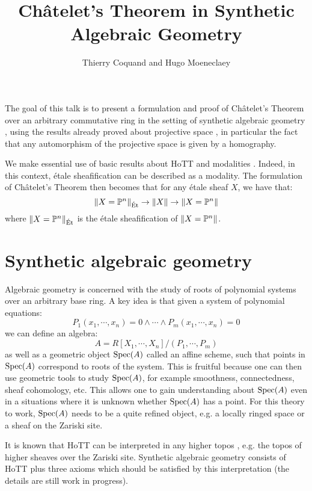 \documentclass{../util/zariski}
\title{Ch\^atelet's Theorem in Synthetic Algebraic Geometry}
\author{Thierry Coquand and Hugo Moeneclaey}
\begin{document}
\maketitle

The goal of this talk is to present a formulation and proof of Ch\^atelet's Theorem over an arbitrary commutative ring
in the setting of synthetic algebraic geometry \cite{draft}, using the results already proved about projective
space \cite{sag-projective}, in particular the fact that any automorphism of the projective space is given
by a homography. 

We make essential use of basic results about HoTT \cite{hott}
and modalities \cite{modalities}. Indeed, in this context, \'etale sheafification can be described
as a modality. The formulation of Ch\^atelet's Theorem then becomes that for any étale sheaf $X$, we have that:
\[\lVert X=\mathbb{P}^n \rVert_{\mathrm{\acute{E}t}} \to \lVert X \rVert \to \lVert X=\mathbb{P}^n \rVert\]
where $\lVert X=\mathbb{P}^n \rVert_{\mathrm{\acute{E}t}}$ is the étale sheafification of $\lVert X=\mathbb{P}^n \rVert$.


\section{Synthetic algebraic geometry}

Algebraic geometry is concerned with the study of roots of polynomial systems over an arbitrary base ring. A key idea is that given a system of polynomial equations:
\[P_1(x_1,\cdots,x_n)=0\land\cdots\land P_m(x_1,\cdots,x_n)=0\]
we can define an algebra:
\[A = R[X_1,\cdots,X_n]/(P_1,\cdots,P_m)\]
as well as a geometric object $\operatorname{Spec}(A)$ called an affine scheme, such that points in $\operatorname{Spec}(A)$ correspond to roots of the system. This is fruitful because one can then use geometric tools to study $\operatorname{Spec}(A)$, for example smoothness, connectedness, sheaf cohomology, etc. This allows one to gain understanding about $\operatorname{Spec}(A)$ even in a situations where it is unknown whether $\operatorname{Spec}(A)$ has a point. For this theory to work, $\operatorname{Spec}(A)$ needs to be a quite refined object, e.g. a locally ringed space or a sheaf on the Zariski site.

It is known that HoTT can be interpreted in any higher topos \cite{shulman2019all}, e.g. the topos of higher sheaves over the Zariski site. Synthetic algebraic geometry consists of HoTT plus three axioms which should be satisfied by this interpretation (the details are still work in progress).
\end{document}
